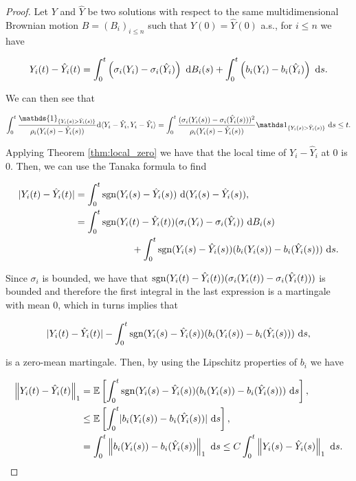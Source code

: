 \begin{proof}
    Let $Y$ and $\hat Y$ be two solutions with respect to the same multidimensional Brownian motion $B = (B_i)_{i \le n}$ such that $Y(0) = \hat Y(0)$ %
    a.s., for $i\le n$ we have

    \begin{equation}
        Y_i(t) - \hat Y_i(t) = \int_0^t \left(\sigma_i(Y_i) - \sigma_i(\hat Y_i)\right) ~\mathrm d B_i(s) + \int_0^t \left(b_i(Y_i) - b_i(\hat Y_i) \right)~\mathrm d s.
    \end{equation}

    We can then see that

    \begin{equation*}
        \int_0^t \frac{\mathds{1}_{\{Y_i(s) > \hat Y_i(s)\}}}{\rho_i(Y_i(s)- \hat Y_i(s))} \d \langle Y_i - \hat Y_i, Y_i - \hat Y_i \rangle = \int_0^t \frac{( \sigma_i (Y_i(s)) - \sigma_i (\hat Y_i(s)) )^2}{\rho_i(Y_i(s) - \hat Y_i(s))} \mathds 1_{\{Y_i(s) > \hat Y_i(s)\}} ~\d s \le t.
    \end{equation*}
    
    Applying Theorem \ref{thm:local_zero} we have that the local time of $Y_i - \hat Y_i$ at 0 is 0. Then, we can use the Tanaka formula to find

    \begin{align*}
        \lvert  Y_i(t) - \hat Y_i(t)  \rvert &= \int_0^t \mathrm{sgn}(Y_i(s) - \hat Y_i(s)) ~\mathrm d( Y_i(s) - \hat Y_i(s) ),\\
        &= \int_0^t \mathrm{sgn}(Y_i(t) - \hat Y_i(t))(\sigma_i(Y_i) - \sigma_i(\hat Y_i)) ~\mathrm d B_i(s)\\
        &\phantom{espacioteeeee}+ \int_0^t \mathrm{sgn}(Y_i(s) - \hat Y_i(s))(b_i(Y_i(s)) - b_i(\hat Y_i(s))) ~ \mathrm d s.
    \end{align*}

    Since $\sigma_i$ is bounded, we have that $\mathrm{sgn}(Y_i(t) - \hat Y_i(t))(\sigma_i(Y_i(t)) - \sigma_i(\hat Y_i(t)))$ is bounded and therefore the first integral in the last expression is a martingale with mean 0, which in turns implies that

    \begin{equation*}
        \lvert  Y_i(t) - \hat Y_i(t)  \rvert - \int_0^t \mathrm{sgn}(Y_i(s) - \hat Y_i(s))(b_i(Y_i(s)) - b_i(\hat Y_i(s)))~\mathrm d s,
    \end{equation*}

    \noindent is a zero-mean martingale. Then, by using the Lipschitz properties of $b_i$ we have

    \begin{align*}
        \left\lVert Y_i(t) - \hat Y_i(t)\right\rVert_1 &= \mathbb E \left[   \int_0^t \mathrm{sgn}(Y_i(s) - \hat Y_i(s))(b_i(Y_i(s)) - b_i(\hat Y_i(s)))~\mathrm d s  \right],\\
        &\le \mathbb E \left[  \int_0^t \lvert b_i(Y_i(s)) - b_i(\hat Y_i(s)) \rvert~\mathrm d s \right],\\
        &= \int_0^t  \left\lVert b_i(Y_i(s)) - b_i(\hat Y_i(s)) \right\rVert_1~\mathrm d s 
        \le  C\int_0^t \left\lVert Y_i(s) - \hat Y_i(s)\right\rVert_1 ~\mathrm d s.
    \end{align*}


\end{proof}
